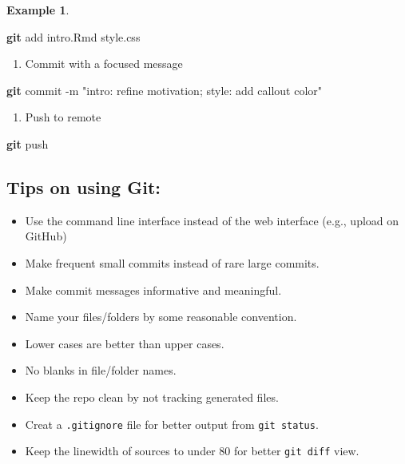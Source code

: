 \documentclass[
]{book}
\newenvironment{Shaded}{\begin{snugshade}}{\end{snugshade}}
\newcommand{\AttributeTok}[1]{\textcolor[rgb]{0.13,0.29,0.53}{#1}}
\newcommand{\FunctionTok}[1]{\textcolor[rgb]{0.13,0.29,0.53}{\textbf{#1}}}
\newcommand{\NormalTok}[1]{#1}
\newcommand{\StringTok}[1]{\textcolor[rgb]{0.31,0.60,0.02}{#1}}
\providecommand{\tightlist}{%
  \setlength{\itemsep}{0pt}\setlength{\parskip}{0pt}}
\theoremstyle{definition}
\theoremstyle{definition}
\newtheorem{example}{Example}[chapter]
\theoremstyle{definition}
\theoremstyle{definition}
\theoremstyle{remark}
\begin{document}
\begin{example}
\begin{Shaded}
\begin{Highlighting}[]
\FunctionTok{git}\NormalTok{ add intro.Rmd style.css}
\end{Highlighting}
\end{Shaded}

\begin{enumerate}
\def\labelenumi{\arabic{enumi}.}
\setcounter{enumi}{4}
\tightlist
\item
  Commit with a focused message
\end{enumerate}

\begin{Shaded}
\begin{Highlighting}[]
\FunctionTok{git}\NormalTok{ commit }\AttributeTok{{-}m} \StringTok{"intro: refine motivation; style: add callout color"}
\end{Highlighting}
\end{Shaded}

\begin{enumerate}
\def\labelenumi{\arabic{enumi}.}
\setcounter{enumi}{5}
\tightlist
\item
  Push to remote
\end{enumerate}

\begin{Shaded}
\begin{Highlighting}[]
\FunctionTok{git}\NormalTok{ push}
\end{Highlighting}
\end{Shaded}

\end{example}

\subsection{Tips on using Git:}\label{tips-on-using-git}

\begin{itemize}
\tightlist
\item
  Use the command line interface instead of the web interface (e.g., upload on GitHub)
\item
  Make frequent small commits instead of rare large commits.
\item
  Make commit messages informative and meaningful.
\item
  Name your files/folders by some reasonable convention.
\item
  Lower cases are better than upper cases.
\item
  No blanks in file/folder names.
\item
  Keep the repo clean by not tracking generated files.
\item
  Creat a \texttt{.gitignore} file for better output from \texttt{git\ status}.
\item
  Keep the linewidth of sources to under 80 for better \texttt{git\ diff} view.
\end{itemize}
\end{document}
